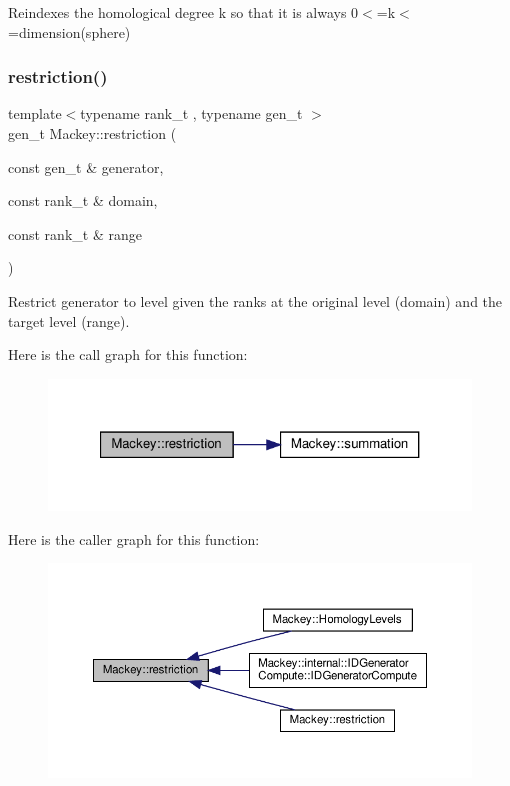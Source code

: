 Reindexes the homological degree k so that it is always 0$<$=k$<$=dimension(sphere) 

\mbox{\label{namespaceMackey_ad1e907ff76b07d4fc4c9d4bdf25918bd}} 
\subsubsection{\texorpdfstring{restriction()}{restriction()}\hspace{0.1cm}{\footnotesize\ttfamily [1/2]}}
{\footnotesize\ttfamily template$<$typename rank\+\_\+t , typename gen\+\_\+t $>$ \\
gen\+\_\+t Mackey\+::restriction (\begin{DoxyParamCaption}\item[{const gen\+\_\+t \&}]{generator,  }\item[{const rank\+\_\+t \&}]{domain,  }\item[{const rank\+\_\+t \&}]{range }\end{DoxyParamCaption})}



Restrict generator to level given the ranks at the original level (domain) and the target level (range). 

Here is the call graph for this function\+:\nopagebreak
\begin{figure}[H]
\begin{center}
\leavevmode
\includegraphics[width=321pt]{namespaceMackey_ad1e907ff76b07d4fc4c9d4bdf25918bd_cgraph}
\end{center}
\end{figure}
Here is the caller graph for this function\+:\nopagebreak
\begin{figure}[H]
\begin{center}
\leavevmode
\includegraphics[width=350pt]{namespaceMackey_ad1e907ff76b07d4fc4c9d4bdf25918bd_icgraph}
\end{center}
\end{figure}
\mbox{\label{namespaceMackey_a256b1e73e413a924ce2bf0e86551a928}} 
